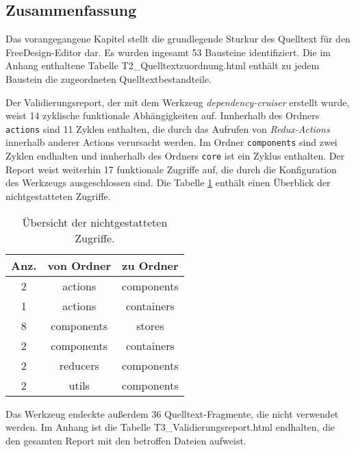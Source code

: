 \subsection{Zusammenfassung}
Das vorangegangene Kapitel stellt die grundlegende Sturkur des Quelltext für den FreeDesign-Editor dar. 
Es wurden ingesamt 53 Bausteine identifiziert. Die im Anhang enthaltene Tabelle T2\_Quelltextzuordnung.html enthält zu jedem Baustein die zugeordneten Quelltextbestandteile.  

Der Validierungsreport, der mit dem Werkzeug \emph{dependency-cruiser} erstellt wurde, weist 14 zyklische funktionale Abhängigkeiten auf.
Innherhalb des Ordners \lstinline|actions| sind 11 Zyklen enthalten, die durch das Aufrufen von \emph{Redux-Actions} innerhalb anderer Actions verursacht werden. 
Im Ordner \lstinline|components| sind zwei Zyklen endhalten und innherhalb des Ordners \lstinline|core| ist ein Zyklus enthalten.
Der Report weist weiterhin 17 funktionale Zugriffe auf, die durch die Konfiguration des Werkzeugs ausgeschlossen sind. 
Die Tabelle \ref{table:not_allowed} enthält einen Überblick der nichtgestatteten Zugriffe.

\begin{table}[H]
    \centering
    \caption{Übersicht der nichtgestatteten Zugriffe.}
    \begin{tabular}{c|c|c}        
        \label{table:not_allowed}
        Anz. & von Ordner & zu Ordner \\
        \hline
        2 & actions & components \\
        1 & actions & containers \\
        8 & components & stores \\
        2 & components & containers \\
        2 & reducers & components \\
        2 & utils & components \\
    \end{tabular}
\end{table}    
 
Das Werkzeug endeckte außerdem 36 Quelltext-Fragmente, die nicht verwendet werden. 
Im Anhang ist die Tabelle T3\_Validierungsreport.html endhalten, die den gesamten Report mit den betroffen Dateien aufweist. 



